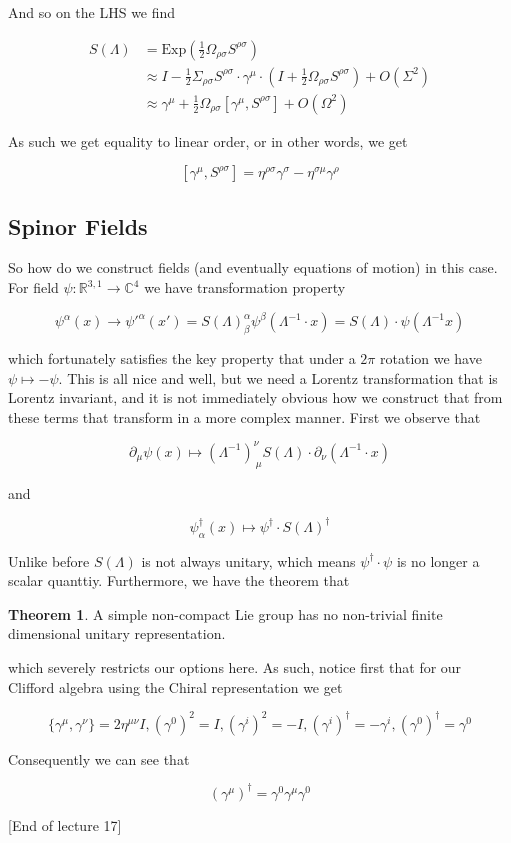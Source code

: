 \documentclass{article}
\theoremstyle{definition}
\newtheorem{theorem}{Theorem}
\begin{document}
And so on the LHS we find

\begin{align*}
  S(\Lambda) &= \text{Exp} \left( \frac{1}{2} \Omega_{\rho \sigma}
               S^{\rho \sigma} \right) \\
             &\approx I - \frac{1}{2} \Sigma_{\rho \sigma} S^{\rho \sigma}
               \cdot \gamma^\mu \cdot \left( I + \frac{1}{2} \Omega_{\rho \sigma}
               S^{\rho \sigma} \right) + O(\Sigma^2) \\
             &\approx \gamma^\mu + \frac{1}{2} \Omega_{\rho \sigma}
               [\gamma^\mu, S^{\rho \sigma}] + O(\Omega^2)
\end{align*}

As such we get equality to linear order, or in other words, we get

$$ [\gamma^\mu, S^{\rho \sigma}] = \eta^{\rho \sigma} \gamma^\sigma -
\eta^{\sigma \mu} \gamma^\rho $$

\subsection{Spinor Fields}

So how do we construct fields (and eventually equations of motion) in this case.
For field $\psi : \mathbb{R}^{3, 1} \to \mathbb{C}^4$ we have transformation
property

$$ \psi^\alpha(x) \to \psi'^\alpha(x') = S(\Lambda)^\alpha_\beta
\psi^\beta(\Lambda^{-1} \cdot x) = S(\Lambda) \cdot \psi(\Lambda^{-1} x) $$

which fortunately satisfies the key property that under a $2\pi$ rotation we
have $\psi \mapsto -\psi$. This is all nice and well, but we need a Lorentz
transformation that is Lorentz invariant, and it is not immediately obvious how
we construct that from these terms that transform in a more complex manner.
First we observe that

$$ \partial_\mu \psi(x) \mapsto (\Lambda^{-1})^\nu_{\ \mu} S(\Lambda) \cdot
\partial_\nu (\Lambda^{-1} \cdot x) $$

and 

$$ \psi^\dagger_\alpha(x) \mapsto \psi^\dagger \cdot S(\Lambda)^\dagger $$

Unlike before $S(\Lambda)$ is not always unitary, which means $\psi^\dagger
\cdot \psi$ is no longer a scalar quanttiy. Furthermore, we have the theorem
that

\begin{theorem}
A simple non-compact Lie group has no non-trivial finite dimensional unitary
representation.
\end{theorem}

which severely restricts our options here. As such, notice first that for our
Clifford algebra using the Chiral representation we get

$$ \{\gamma^\mu, \gamma^\nu\} = 2\eta^{\mu \nu} I, (\gamma^0)^2 = I,
(\gamma^i)^2 = -I, (\gamma^i)^\dagger = -\gamma^i, (\gamma^0)^\dagger =
\gamma^0 $$

Consequently we can see that

$$ (\gamma^\mu)^\dagger = \gamma^0 \gamma^\mu \gamma^0 $$

[End of lecture 17]
\end{document}
